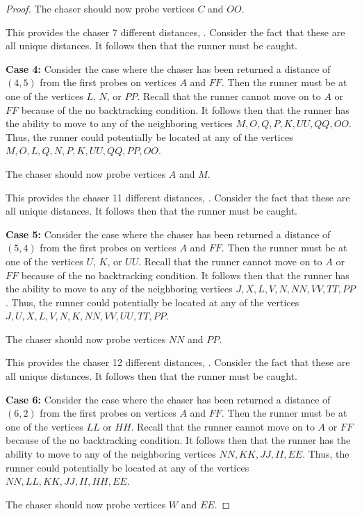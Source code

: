 \documentclass[11pt]{article}
\begin{document}
\begin{proof}
		The chaser should now probe vertices $C$ and $OO$.
		
		This provides the chaser 7 different distances, . Consider the fact that these are all unique distances. It follows then that the runner must be caught.
		
		\textbf{Case 4:} Consider the case where the chaser has been returned a distance of $(4,5)$ from the first probes on vertices $A$ and $FF$. Then the runner must be at one of the vertices $L$, $N$, or $PP$. Recall that the runner cannot move on to $A$ or $FF$ because of the no backtracking condition. It follows then that the runner has the ability to move to any of the neighboring vertices $M,O,Q,P,K,UU,QQ,OO$. Thus, the runner could potentially be located at any of the vertices $M,O,L,Q,N,P,K,UU,QQ,PP,OO$.
		
		The chaser should now probe vertices $A$ and $M$.
		
		This provides the chaser 11 different distances, . Consider the fact that these are all unique distances. It follows then that the runner must be caught.
		
		\textbf{Case 5:} Consider the case where the chaser has been returned a distance of $(5,4)$ from the first probes on vertices $A$ and $FF$. Then the runner must be at one of the vertices $U$, $K$, or $UU$. Recall that the runner cannot move on to $A$ or $FF$ because of the no backtracking condition. It follows then that the runner has the ability to move to any of the neighboring vertices $J,X,L,V,N,NN,VV,TT,PP$. Thus, the runner could potentially be located at any of the vertices $J,U,X,L,V,N,K,NN,VV,UU,TT,PP$.
		
		The chaser should now probe vertices $NN$ and $PP$.
		
		This provides the chaser 12 different distances, . Consider the fact that these are all unique distances. It follows then that the runner must be caught.
		
		\textbf{Case 6:} Consider the case where the chaser has been returned a distance of $(6,2)$ from the first probes on vertices $A$ and $FF$. Then the runner must be at one of the vertices $LL$ or $HH$. Recall that the runner cannot move on to $A$ or $FF$ because of the no backtracking condition. It follows then that the runner has the ability to move to any of the neighboring vertices $NN,KK,JJ,II,EE$. Thus, the runner could potentially be located at any of the vertices $NN,LL,KK,JJ,II,HH,EE$.
		
		The chaser should now probe vertices $W$ and $EE$.
		

\end{proof}
\end{document}
